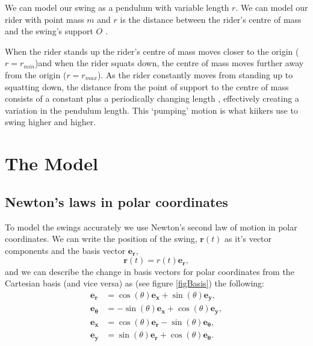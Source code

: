 \documentclass[12pt]{article}
\begin{document}

We can model our swing as a pendulum with variable length $r$.  We can model our rider with point mass $m$ and $r$ is the distance between the rider's centre of mass and the swing's support $O$ \cite{wirkus1998pump}.  

When the rider stands up the rider's centre of mass moves closer to the origin ($r = r_{min}$)and when the rider squats down, the centre of mass moves further away from the origin ($r = r_{max}$). As the rider constantly moves from standing up to squatting down, the distance from the point of support to the centre of mass consists of a constant plus a periodically changing length \cite{William1996standing}, effectively creating a variation in the pendulum length. This `pumping' motion is what kiikers use to swing higher and higher. 

\section{The Model}
\subsection{Newton's laws in polar coordinates}

To model the swings accurately we use Newton's second law %
of motion in polar coordinates. We can write the position of the swing, $\mathbf{r} (t)$ 
as it's vector components and the basis vector $\mathbf{e_r}$,
$$\mathbf{r}(t) = r(t)\mathbf{e_r},$$
and we can describe the change in basis vectors for polar coordinates from the Cartesian basis (and vice versa) as (see figure \ref{figBasis}) the following:
\begin{align}
    \mathbf{e_r} &= \cos(\theta) \mathbf{e_x} + \sin(\theta) \mathbf{e_y}, \\
    \mathbf{e_\theta} &= -\sin(\theta) \mathbf{e_x} + \cos(\theta) \mathbf{e_y},\\
    \mathbf{e_x} &= \cos(\theta)\mathbf{e_r} - \sin(\theta) \mathbf{e_\theta},\\
    \mathbf{e_y} &= \sin(\theta) \mathbf{e_r} + \cos(\theta) \mathbf{e_\theta}.
\end{align}
\end{document}
